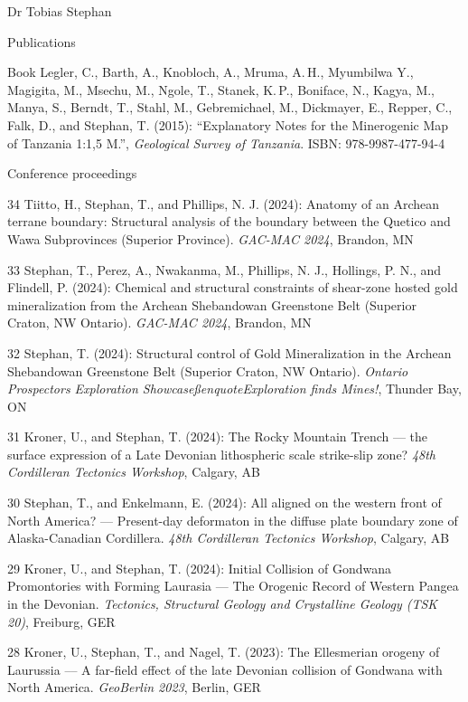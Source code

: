 \documentclass[10pt, paper=letter]{scrartcl} %
\begin{document}
\begin{cv}{Dr Tobias Stephan}
\begin{cvlist}{Publications}
% 
    
    \item[Book] Legler, C., Barth, A., Knobloch, A., Mruma, A.\,H., Myumbilwa Y.,  Magigita, M., Msechu, M., Ngole, T., Stanek, K.\,P., Boniface, N., Kagya, M., Manya, S., Berndt, T., Stahl, M., Gebremichael, M., Dickmayer, E., Repper, C., Falk, D., and Stephan, T. (2015): \enquote{Explanatory Notes for the Minerogenic Map of Tanzania 1:1,5 M.}, \textit{Geological Survey of Tanzania}. ISBN: 978-9987-477-94-4	 
\end{cvlist}



\begin{cvlist}{Conference proceedings} %
    \item[34] Tiitto, H., Stephan, T., and Phillips, N. J. (2024): Anatomy of an Archean terrane boundary: Structural analysis of the boundary between the Quetico and Wawa Subprovinces (Superior Province). \textit{GAC-MAC 2024}, Brandon, MN
    \item[33] Stephan, T., Perez, A., Nwakanma, M., Phillips, N. J., Hollings, P. N., and Flindell, P. (2024): Chemical and structural constraints of shear-zone hosted gold mineralization from the Archean Shebandowan Greenstone Belt (Superior Craton, NW Ontario). \textit{GAC-MAC 2024}, Brandon, MN   
    \item[32] Stephan, T. (2024): Structural control of Gold Mineralization in the Archean Shebandowan Greenstone Belt (Superior Craton, NW Ontario). \textit{Ontario Prospectors Exploration Showcase\ss{}enquote{Exploration finds Mines!}}, Thunder Bay, ON   
     \item[31] Kroner, U., and Stephan, T. (2024): The Rocky Mountain Trench --- the surface expression of a Late Devonian lithospheric scale strike-slip zone? \textit{48th Cordilleran Tectonics Workshop}, Calgary, AB
     \item[30] Stephan, T., and Enkelmann, E. (2024): All aligned on the western front of North America? --– Present-day deformaton in the diffuse plate boundary zone of Alaska-Canadian Cordillera. \textit{48th Cordilleran Tectonics Workshop}, Calgary, AB
     \item[29] Kroner, U., and Stephan, T. (2024): Initial Collision of Gondwana Promontories with Forming Laurasia --- The Orogenic Record of Western Pangea in the Devonian. \textit{Tectonics, Structural Geology and Crystalline Geology (TSK 20)}, Freiburg, GER
     \item[28] Kroner, U., Stephan, T., and Nagel, T. (2023): The Ellesmerian orogeny of Laurussia –-- A far-field effect of the late Devonian collision of Gondwana with North America. \textit{GeoBerlin 2023}, Berlin, GER

\end{cvlist}
\end{cv}
\end{document}
